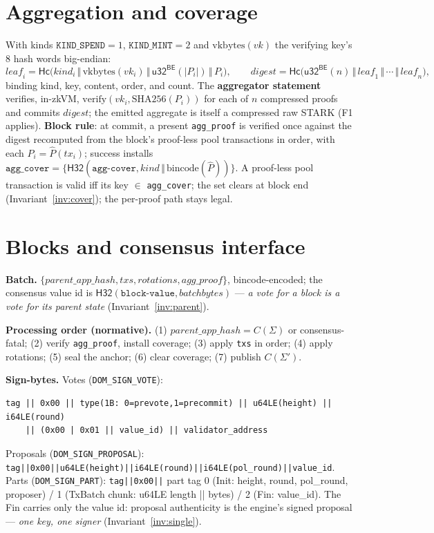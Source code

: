 \documentclass[10pt]{article}
\newcommand{\ct}[1]{\texttt{#1}}
\newcommand{\Hs}{\mathsf{H32}}
\newcommand{\Hc}{\mathsf{Hc}}
\newcommand{\cat}{\,\Vert\,}
\newcommand{\stx}{\ensuremath{\Sigma}}
\begin{document}
\section{Aggregation and coverage}\label{sec:agg}
With kinds $\ct{KIND\_SPEND}=1$, $\ct{KIND\_MINT}=2$ and $\mathrm{vkbytes}(\mathit{vk})$ the verifying key's 8 hash words big-endian:
\[ \mathit{leaf}_i = \Hc\big(\mathit{kind}_i \cat \mathrm{vkbytes}(\mathit{vk}_i) \cat \mathsf{u32^{BE}}(|P_i|) \cat P_i\big), \qquad \mathit{digest} = \Hc\big(\mathsf{u32^{BE}}(n) \cat \mathit{leaf}_1 \cat \cdots \cat \mathit{leaf}_n\big), \]
binding kind, key, content, order, and count. The \textbf{aggregator statement} verifies, in-zkVM, $\mathrm{verify}(\mathit{vk}_i, \mathrm{SHA256}(P_i))$ for each of $n$ compressed proofs and commits $\mathit{digest}$; the emitted aggregate is itself a compressed raw STARK (F1 applies). \textbf{Block rule}: at commit, a present \ct{agg\_proof} is verified once against the digest recomputed from the block's proof-less pool transactions in order, with each $P_i = \hat P(\mathit{tx}_i)$; success installs $\ct{agg\_cover} = \{\Hs(\ct{agg-cover}, \mathit{kind}\cat\mathrm{bincode}(\hat P))\}$. A proof-less pool transaction is valid iff its key $\in$ \ct{agg\_cover}; the set clears at block end (Invariant~\ref{inv:cover}); the per-proof path stays legal.

\section{Blocks and consensus interface}\label{sec:consint}
\textbf{Batch.} $\{\mathit{parent\_app\_hash}, \mathit{txs}, \mathit{rotations}, \mathit{agg\_proof}\}$, bincode-encoded; the consensus value id is $\Hs(\ct{block-value}, \mathit{batchbytes})$ --- \emph{a vote for a block is a vote for its parent state} (Invariant~\ref{inv:parent}).

\textbf{Processing order (normative).} (1) $\mathit{parent\_app\_hash} = C(\stx)$ or consensus-fatal; (2) verify \ct{agg\_proof}, install coverage; (3) apply \ct{txs} in order; (4) apply rotations; (5) seal the anchor; (6) clear coverage; (7) publish $C(\stx')$.

\textbf{Sign-bytes.} Votes (\ct{DOM\_SIGN\_VOTE}):
\begin{lstlisting}
tag || 0x00 || type(1B: 0=prevote,1=precommit) || u64LE(height) || i64LE(round)
    || (0x00 | 0x01 || value_id) || validator_address
\end{lstlisting}
Proposals (\ct{DOM\_SIGN\_PROPOSAL}): \ct{tag||0x00||u64LE(height)||i64LE(round)||i64LE(pol\_round)||value\_id}. Parts (\ct{DOM\_SIGN\_PART}): \ct{tag||0x00||} part tag 0 (Init: height, round, pol\_round, proposer) / 1 (TxBatch chunk: u64LE length || bytes) / 2 (Fin: value\_id). The Fin carries only the value id: proposal authenticity is the engine's signed proposal --- \emph{one key, one signer} (Invariant~\ref{inv:single}).
\end{document}
